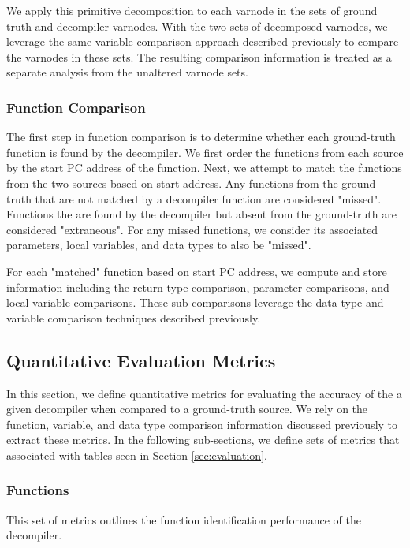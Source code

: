 \documentclass[conference]{IEEEtran}
\begin{document}
We apply this primitive decomposition to each varnode in the sets of ground truth and decompiler varnodes. With the two sets of decomposed varnodes, we leverage the same variable comparison approach described previously to compare the varnodes in these sets. The resulting comparison information is treated as a separate analysis from the unaltered varnode sets.

\subsubsection{Function Comparison}

The first step in function comparison is to determine whether each ground-truth function is found by the decompiler. We first order the functions from each source by the start PC address of the function. Next, we attempt to match the functions from the two sources based on start address. Any functions from the ground-truth that are not matched by a decompiler function are considered "missed". Functions the are found by the decompiler but absent from the ground-truth are considered "extraneous". For any missed functions, we consider its associated parameters, local variables, and data types to also be "missed".

For each "matched" function based on start PC address, we compute and store information including the return type comparison, parameter comparisons, and local variable comparisons. These sub-comparisons leverage the data type and variable comparison techniques described previously.

\subsection{Quantitative Evaluation Metrics}

In this section, we define quantitative metrics for evaluating the accuracy of the a given decompiler when compared to a ground-truth source. We rely on the function, variable, and data type comparison information discussed previously to extract these metrics. In the following sub-sections, we define sets of metrics that associated with tables seen in Section \ref{sec:evaluation}.

\subsubsection{Functions}

This set of metrics outlines the function identification performance of the decompiler.
\end{document}
